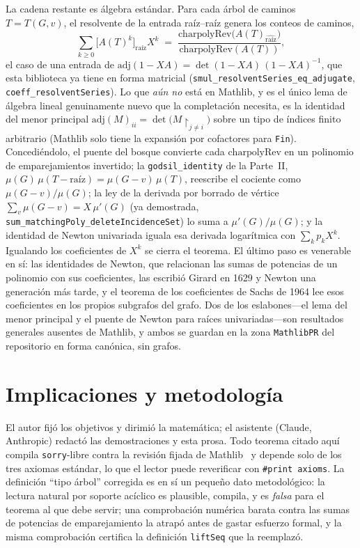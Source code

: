 \documentclass[11pt]{article}
\newcommand{\lean}[1]{\texttt{#1}}
\begin{document}
La cadena restante es \'algebra est\'andar. Para cada \'arbol de caminos $T=T(G,v)$, el resolvente de la
entrada ra\'iz--ra\'iz genera los conteos de caminos,
\[
  \sum_{k\ge0}\bigl[A(T)^k\bigr]_{\text{ra\'iz}}X^{k}
  \;=\;\frac{\mathrm{charpolyRev}\bigl(A(T)_{\widehat{\text{ra\'iz}}}\bigr)}{\mathrm{charpolyRev}(A(T))},
\]
el caso de una entrada de $\mathrm{adj}(1-XA)=\det(1-XA)\,(1-XA)^{-1}$, que esta biblioteca ya tiene en
forma matricial (\lean{smul\_resolventSeries\_eq\_adjugate}, \lean{coeff\_resolventSeries}). Lo que
\emph{a\'un no} est\'a en Mathlib, y es el \'unico lema de \'algebra lineal genuinamente nuevo que la
completaci\'on necesita, es la identidad del menor principal
$\mathrm{adj}(M)_{ii}=\det\bigl(M\!\restriction_{j\neq i}\bigr)$ sobre un tipo de \'indices finito
arbitrario (Mathlib solo tiene la expansi\'on por cofactores para \lean{Fin}). Concedi\'endolo, el puente
del bosque convierte cada $\mathrm{charpolyRev}$ en un polinomio de emparejamientos invertido; la
\lean{godsil\_identity} de la Parte~II, $\mu(G)\,\mu(T-\text{ra\'iz})=\mu(G-v)\,\mu(T)$, reescribe
el cociente como $\mu(G-v)/\mu(G)$; la ley de la derivada por borrado de v\'ertice
$\sum_v\mu(G-v)=X\,\mu'(G)$ (ya demostrada, \lean{sum\_matchingPoly\_deleteIncidenceSet}) lo suma a
$\mu'(G)/\mu(G)$; y la identidad de Newton univariada iguala esa derivada logar\'itmica con
$\sum_k p_k X^{k}$. Igualando los coeficientes de $X^k$ se cierra el teorema. El \'ultimo paso es venerable en s\'i: las
identidades de Newton, que relacionan las sumas de potencias de un polinomio con sus coeficientes, las
escribi\'o Girard en 1629 y Newton una generaci\'on m\'as tarde, y el teorema de los coeficientes de
Sachs de 1964 lee esos coeficientes en los propios subgrafos del grafo. Dos de los eslabones---el lema
del menor principal y el puente de Newton para ra\'ices univariadas---son resultados generales ausentes
de Mathlib, y ambos se guardan en la zona \texttt{MathlibPR} del repositorio en forma can\'onica, sin
grafos.

\section{Implicaciones y metodolog\'ia}
\label{sec:implications}

El autor fij\'o los objetivos y dirimi\'o la matem\'atica; el asistente (Claude, Anthropic) redact\'o las
demostraciones y esta prosa. Todo teorema citado aqu\'i compila \lean{sorry}-libre contra la revisi\'on
fijada de Mathlib~\cite{Mathlib} y depende solo de los tres axiomas est\'andar, lo que el lector puede
reverificar con \lean{\#print axioms}. La definici\'on ``tipo \'arbol'' corregida es en s\'i un peque\~no
dato metodol\'ogico: la lectura natural por soporte ac\'iclico es plausible, compila, y es \emph{falsa}
para el teorema al que debe servir; una comprobaci\'on num\'erica barata contra las sumas de potencias de
emparejamiento la atrap\'o antes de gastar esfuerzo formal, y la misma comprobaci\'on certifica la
definici\'on \lean{liftSeq} que la reemplaz\'o.
\end{document}
